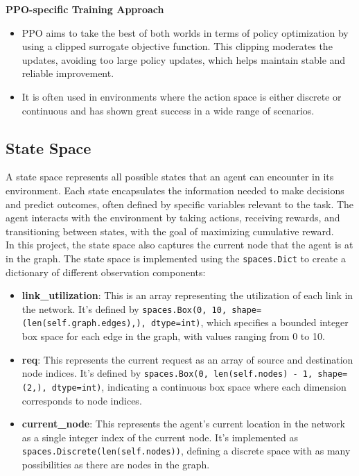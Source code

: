\documentclass[conference]{IEEEtran}
\begin{document}
\textbf{PPO-specific Training Approach}

\begin{itemize}
    \item PPO aims to take the best of both worlds in terms of policy optimization by using a clipped surrogate objective function. This clipping moderates the updates, avoiding too large policy updates, which helps maintain stable and reliable improvement.
    
    \item It is often used in environments where the action space is either discrete or continuous and has shown great success in a wide range of scenarios.
\end{itemize}



\subsection{State Space}
A state space represents all possible states that an agent can encounter in its environment. Each state encapsulates the information needed to make decisions and predict outcomes, often defined by specific variables relevant to the task. The agent interacts with the environment by taking actions, receiving rewards, and transitioning between states, with the goal of maximizing cumulative reward.\\
In this project, the state space also captures the current node that the agent is at in the graph. The state space is implemented using the \texttt{spaces.Dict} to create a dictionary of different observation components:
\begin{itemize}
    \item \textbf{link\_utilization}: This is an array representing the utilization of each link in the network. It's defined by \texttt{spaces.Box(0, 10, shape=(len(self.graph.edges),), dtype=int)}, which specifies a bounded integer box space for each edge in the graph, with values ranging from 0 to 10.
    \item \textbf{req}: This represents the current request as an array of source and destination node indices. It’s defined by \texttt{spaces.Box(0, len(self.nodes) - 1, shape=(2,), dtype=int)}, indicating a continuous box space where each dimension corresponds to node indices.
    \item \textbf{current\_node}: This represents the agent's current location in the network as a single integer index of the current node. It’s implemented as \texttt{spaces.Discrete(len(self.nodes))}, defining a discrete space with as many possibilities as there are nodes in the graph.
\end{itemize}
\end{document}
